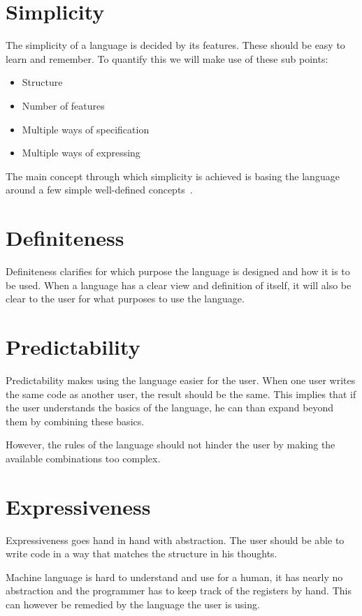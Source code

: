 \section{Simplicity}
The simplicity of a language is decided by its features.
These should be easy to learn and remember.
To quantify this we will make use of these sub points:
\begin{itemize}[noitemsep]
   \item Structure
   \item Number of features
   \item Multiple ways of specification
   \item Multiple ways of expressing
\end{itemize}

The main concept through which simplicity is achieved is basing the language around a few simple well-defined concepts~\cite{khedker1997makes}.

\section{Definiteness}
Definiteness clarifies for which purpose the language is designed and how it is to be used.
When a language has a clear view and definition of itself, it will also be clear to the user for what purposes to use the language.

\section{Predictability}
Predictability makes using the language easier for the user.
When one user writes the same code as another user, the result should be the same.
This implies that if the user understands the basics of the language, he can than expand beyond them by combining these basics.

However, the rules of the language should not hinder the user by making the available combinations too complex.

\section{Expressiveness}
Expressiveness goes hand in hand with abstraction.
The user should be able to write code in a way that matches the structure in his thoughts.

Machine language is hard to understand and use for a human, it has nearly no abstraction and the programmer has to keep track of the registers by hand.
This can however be remedied by the language the user is using.

